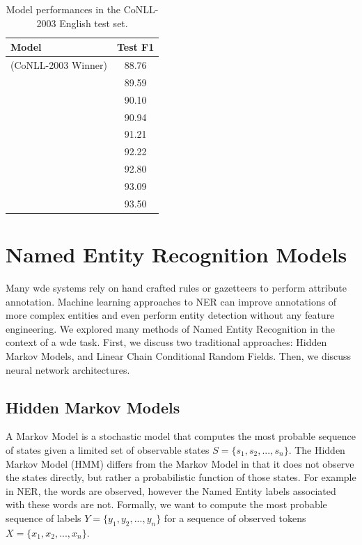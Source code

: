 \documentclass{nle}
\begin{document}
\begin{table}[h]
  \small
  \begin{center}
    \begin{tabular}{ lc }
      \toprule
      Model & Test F1 \\
      \midrule
       \cite{Florian2003} ({CoNLL-2003} Winner)    & 88.76 \\
       \cite{Collobert2011}                        & 89.59 \\
       \cite{Huang2015}                            & 90.10 \\
       \cite{Lample2016}                           & 90.94 \\
       \cite{Ma2016}                               & 91.21 \\
       \cite{Peters2018}                           & 92.22 \\
       \cite{Devlin2018}                           & 92.80 \\
       \cite{Akbik2018}                            & 93.09 \\
       \cite{Baevski2019}                          & 93.50 \\
      \bottomrule
    \end{tabular}
  \end{center}
  \caption{Model performances in the {CoNLL-2003} English test set.}
  \label{tab:ner_model_comparison}
\end{table}

\section{Named Entity Recognition Models}

Many \gls{wde} systems rely on hand crafted rules or gazetteers to perform
attribute annotation. Machine learning approaches to NER can improve annotations of 
more complex entities and even perform entity detection without any feature
engineering. We explored many methods of Named Entity Recognition
in the context of a \gls{wde} task. First, we discuss two traditional 
approaches: Hidden Markov Models, and Linear Chain Conditional Random Fields. Then,
we discuss neural network architectures.

\subsection{Hidden Markov Models}

A Markov Model is a stochastic model that computes the most probable sequence of states 
given a limited set of observable states $ S = \{s_1, s_2, ..., s_n \} $.
The Hidden Markov Model (HMM) differs from the Markov Model in that it
does not observe the states directly, but rather a probabilistic function of those 
states. For example in NER, the words are observed, however the Named Entity labels
associated with these words are not. Formally, we want to compute the most probable
sequence of labels $ Y = \{y_1, y_2, ..., y_n\} $ for a sequence of observed tokens
$ X = \{x_1, x_2, ..., x_n\} $.
\end{document}
